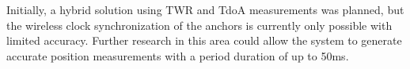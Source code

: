 \documentclass[conference, a4paper]{IEEEtran}
\begin{document}
Initially, a hybrid solution using \ac{TWR} and \ac{TdoA} measurements was planned,
but the wireless clock synchronization of the anchors is currently only possible with limited accuracy.
Further research in this area could allow the system to generate accurate position measurements with a period duration of up to 50ms.




 
\end{document}
